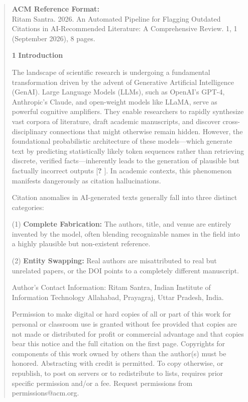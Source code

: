 \documentclass[
]{article}
\begin{document}
\begin{quote}
\textbf{ACM Reference Format:}\\
Ritam Santra. 2026. An Automated Pipeline for Flagging Outdated
Citations in AI-Recommended Literature: A Comprehensive Review. 1, 1
(September 2026), 8 pages.

\textbf{1} \textbf{Introduction}

The landscape of scientific research is undergoing a fundamental
transformation driven by the advent of Generative Artificial
Intelligence (GenAI). Large Language Models (LLMs), such as OpenAI's
GPT-4, Anthropic's Claude, and open-weight models like LLaMA, serve as
powerful cognitive amplifiers. They enable researchers to rapidly
synthesize vast corpora of literature, draft academic manuscripts, and
discover cross-disciplinary connections that might otherwise remain
hidden. However, the foundational probabilistic architecture of these
models---which generate text by predicting statistically likely token
sequences rather than retrieving discrete, verified facts---inherently
leads to the generation of plausible but factually incorrect outputs
{[}\textbf{?} {]}. In academic contexts, this phenomenon manifests
dangerously as citation hallucinations.

Citation anomalies in AI-generated texts generally fall into three
distinct categories:

(1) \textbf{Complete Fabrication:} The authors, title, and venue are
entirely invented by the model, often blending recognizable names in the
field into a highly plausible but non-existent reference.

(2) \textbf{Entity Swapping:} Real authors are misattributed to real but
unrelated papers, or the DOI points to a completely different
manuscript.

Author's Contact Information: Ritam Santra, Indian Institute of
Information Technology Allahabad, Prayagraj, Uttar Pradesh, India.

Permission to make digital or hard copies of all or part of this work
for personal or classroom use is granted without fee provided that
copies are not made or distributed for profit or commercial advantage
and that copies bear this notice and the full citation on the first
page. Copyrights for components of this work owned by others than the
author(s) must be honored. Abstracting with credit is permitted. To copy
otherwise, or republish, to post on servers or to redistribute to lists,
requires prior specific permission and/or a fee. Request permissions
from permissions@acm.org.
\end{quote}
\end{document}
